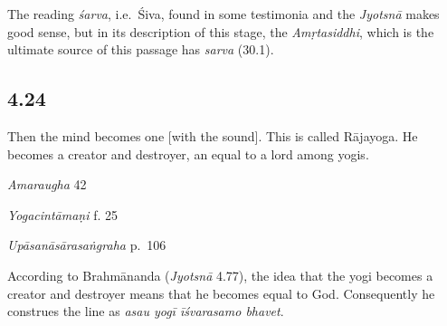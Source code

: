 \begin{ekdosis}
\begin{philcomm}[hp04_023]
The reading \emph{śarva}, i.e.~Śiva, found in some testimonia and the \emph{Jyotsnā} makes good sense, but in its description of this stage, the \emph{Amṛtasiddhi}, which is the ultimate source of this passage has \emph{sarva} (30.1).
\end{philcomm}

\subsection*{4.24}
\begin{translation}[hp04_024]
Then the mind becomes one [with the sound]. This is called Rājayoga. He becomes a creator and destroyer, an equal to a lord among yogis.%
\end{translation}

\begin{sources}[hp04_024]
\emph{Amaraugha} 42
\begin{versinnote}
\tl{\var{rājayogābhidhānakam ] rājayogo 'bhidhīyate Ae}\\!}
\end{versinnote}
\end{sources}

\begin{testimonia}[hp04_024]
\emph{Yogacintāmaṇi} f. 25
\begin{versinnote}
\end{versinnote}

\emph{Upāsanāsārasaṅgraha} p.~106
\begin{versinnote}
\end{versinnote}

\end{testimonia}

\begin{philcomm}[hp04_024]

According to Brahmānanda (\emph{Jyotsnā} 4.77), the idea that the yogi becomes a creator and destroyer means that he becomes equal to God. Consequently he construes the line as \emph{asau yogī īśvarasamo bhavet}.
\end{philcomm}


\end{ekdosis}

